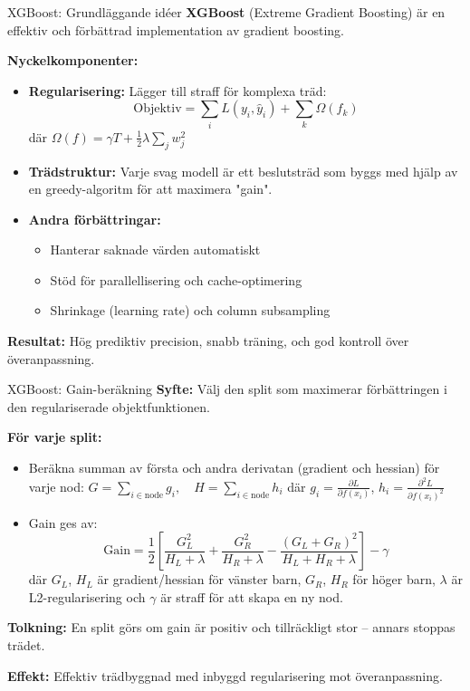 \documentclass[10pt,english]{beamer}
\begin{document}
\begin{frame}{XGBoost: Grundläggande idéer}
  \textbf{XGBoost} (Extreme Gradient Boosting) är en effektiv och förbättrad implementation av gradient boosting.

  \vspace{0.1cm}
  \textbf{Nyckelkomponenter:}
  \begin{itemize}
    \item \textbf{Regularisering:} Lägger till straff för komplexa träd:
    \[
      \text{Objektiv} = \sum_i L(y_i, \hat{y}_i) + \sum_k \Omega(f_k)
    \]
    där $\Omega(f) = \gamma T + \frac{1}{2} \lambda \sum_j w_j^2$

    \item \textbf{Trädstruktur:} Varje svag modell är ett beslutsträd som byggs med hjälp av en greedy-algoritm för att maximera "gain".

    \item \textbf{Andra förbättringar:}
    \begin{itemize}
      \item Hanterar saknade värden automatiskt
      \item Stöd för parallellisering och cache-optimering
      \item Shrinkage (learning rate) och column subsampling
    \end{itemize}
  \end{itemize}

  \vspace{0.1cm}
  \textbf{Resultat:} Hög prediktiv precision, snabb träning, och god kontroll över överanpassning.
\end{frame}


\begin{frame}{XGBoost: Gain-beräkning}
  \textbf{Syfte:} Välj den split som maximerar förbättringen i den regulariserade objektfunktionen.

  \textbf{För varje split:}
  \begin{itemize}
    \item Beräkna summan av första och andra derivatan (gradient och hessian) för varje nod:
    $G = \sum_{i \in \text{node}} g_i, \quad H = \sum_{i \in \text{node}} h_i$
    där $g_i = \frac{\partial L}{\partial f(x_i)}$, $h_i = \frac{\partial^2 L}{\partial f(x_i)^2}$

    \item Gain ges av:
    \[
      \text{Gain} = \frac{1}{2} \left[ \frac{G_L^2}{H_L + \lambda} + \frac{G_R^2}{H_R + \lambda} - \frac{(G_L + G_R)^2}{H_L + H_R + \lambda} \right] - \gamma
    \]
    där $G_L$, $H_L$ är gradient/hessian för vänster barn, $G_R$, $H_R$ för höger barn, $\lambda$ är L2-regularisering och $\gamma$ är straff för att skapa en ny nod.
  \end{itemize}

  \textbf{Tolkning:} En split görs om gain är positiv och tillräckligt stor – annars stoppas trädet.

  \textbf{Effekt:} Effektiv trädbyggnad med inbyggd regularisering mot överanpassning.
\end{frame}
\end{document}
